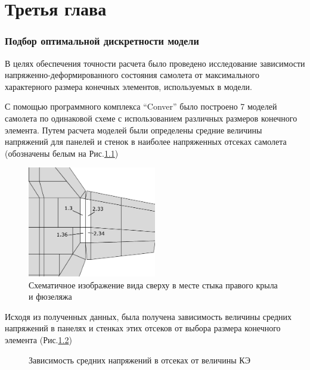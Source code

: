 \documentclass[12pt,a4paper,russian,emptystyle]{report}
\begin{document}

\tableofcontents



\chapter{Третья глава}
\subsection{Подбор оптимальной дискретности модели}

В целях обеспечения точности расчета было проведено исследование зависимости напряженно-деформированного состояния самолета от максимального характерного размера конечных элементов, используемых в модели. 

С помощью программного комплекса ``Conver'' было построено 7 моделей самолета по одинаковой схеме с использованием различных размеров конечного элемента. Путем расчета моделей были определены средние величины напряжений для панелей и стенок в наиболее напряженных отсеках самолета (обозначены белым на  Рис.\ref{fig:WingRootPlain})

\begin{figure}[ht]
\centering
\includegraphics[width=0.5\textwidth]{RootOfWingWithSelectedPartsBW}
\caption{Схематичное изображение вида сверху в месте стыка правого крыла и фюзеляжа}
\label{fig:WingRootPlain}
\end{figure}




Исходя из полученных данных, была получена зависимость величины средних напряжений в панелях и стенках этих отсеков от выбора размера конечного элемента (Рис.\ref{fig:stressToDiscreteness})

\begin{figure}[H]
\centering

\caption{Зависимость средних напряжений в отсеках от величины КЭ}
\label{fig:stressToDiscreteness}
\end{figure}
\end{document}
